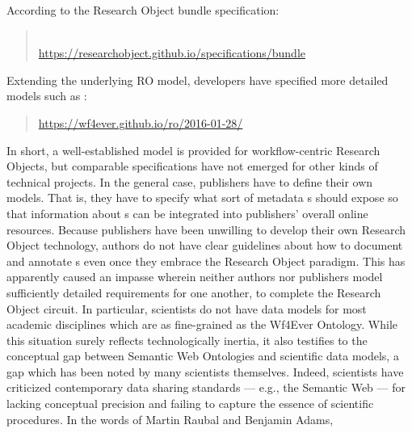 \documentclass[10pt,letterpaper]{article}
\newcommand{\rpdfLink}[1]{\href{#1}{\small{#1}}}
\begin{document}
According to the Research Object bundle specification: 

\begin{quote}{}\\
\rpdfLink{https://researchobject.github.io/specifications/bundle}
\end{quote}

Extending the underlying RO model, developers have 
specified more detailed models such as :

\begin{quote}{}
\rpdfLink{https://wf4ever.github.io/ro/2016-01-28/}
\end{quote}

In short, a well-established model is provided for workflow-centric 
Research Objects, but comparable specifications have not 
emerged for other kinds of technical projects.  In the general 
case, publishers have to define their own {\RO} 
models.  That is, they have to specify what sort of 
metadata {\RO}s should expose so that 
information about {\RO}s can be integrated 
into publishers' overall online resources.  
\p{}
Because publishers have been unwilling to develop their own 
Research Object technology, authors do not have clear 
guidelines about how to document and annotate {\RO}s 
even once they embrace the Research Object paradigm.  
This has apparently caused an impasse wherein 
neither authors nor publishers model sufficiently detailed 
requirements for one another, to complete the Research Object 
circuit.  In particular, scientists do not have 
{\RO} data models for most academic disciplines 
which are as fine-grained as the Wf4Ever Ontology.  
While this situation surely reflects technologically 
inertia, it also testifies to the conceptual gap between 
Semantic Web Ontologies and scientific data models, a gap 
which has been noted by many scientists themselves.  
\p{}
Indeed, scientists have criticized contemporary data sharing standards  
--- e.g., the Semantic Web --- for lacking conceptual precision 
and failing to capture the essence of scientific 
procedures.  In the words of 
Martin Raubal and Benjamin Adams,
\end{document}
